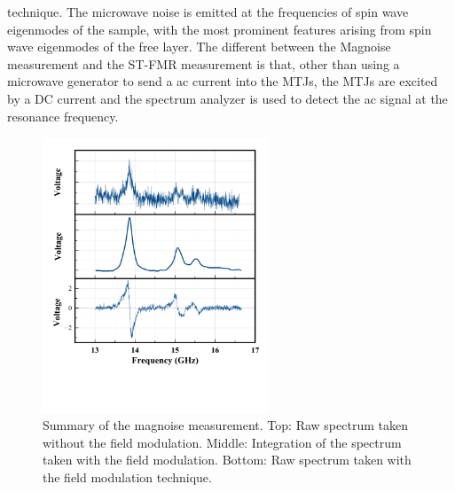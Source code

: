 technique. The microwave noise is emitted at the frequencies of spin wave eigenmodes of the sample, with the most prominent features arising from spin wave eigenmodes of the free layer. The different between the Magnoise measurement and the ST-FMR measurement is that, other than using a microwave generator to send a ac current into the MTJs, the MTJs are excited by a DC current and the spectrum analyzer is used to detect the ac signal at the resonance frequency.

\begin{figure}[!ht]
  \centering
  \includegraphics[width=0.6\textwidth]{fig/magnoise/magnoise-data.png}
   \caption{Summary of the magnoise measurement. Top: Raw spectrum taken without the field modulation. Middle: Integration of the spectrum taken with the field modulation. Bottom: Raw spectrum taken with the field modulation technique.}
  \label{fig:magnoisedata}
\end{figure}


